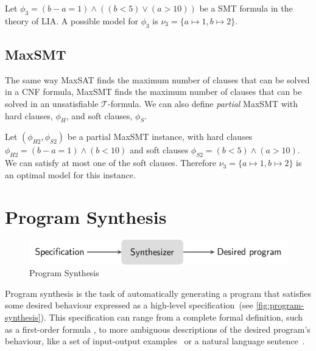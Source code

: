 \begin{example}
Let \(\phi_3 = (b - a = 1) \land ((b<5) \lor (a>10))\) be a \ac{SMT} formula in the theory of LIA. A possible model for \(\phi_3\) is \(\nu_3 = \{a \mapsto 1, b \mapsto 2\}\).
\end{example}


\subsection{\acl{MaxSMT}}

The same way \ac{MaxSAT} finds the maximum number of clauses that can be solved in a \ac{CNF} formula, \ac{MaxSMT} finds the maximum number of clauses that can be solved in an unsatisfiable \(\mathcal{T}\)-formula.
We can also define \textit{partial} \ac{MaxSMT} with hard clauses, \(\phi_H\), and soft clauses, \(\phi_S\).

\begin{example}
Let \((\phi_{H2}, \phi_{S2})\) be a partial \ac{MaxSMT} instance, with hard clauses \(\phi_{H2}=(b-a=1) \land (b<10)\) and soft clauses \(\phi_{S2} = (b<5) \land (a>10)\). We can satisfy at most one of the soft clauses. Therefore \(\nu_3 = \{a \mapsto 1, b \mapsto 2\}\) is an optimal model for this instance.
\end{example}

\section{Program Synthesis} \label{sec:back-ps}
\begin{figure}
    \centering
    \includegraphics[scale=.35]{pictures/program_synthesis.pdf}
    \caption{Program Synthesis}
    \label{fig:program-synthesis}
\end{figure}

Program synthesis is the task of automatically generating a program that satisfies some desired behaviour expressed as a high-level specification~(see \autoref{fig:program-synthesis}).
This specification can range from a complete formal definition, such as a first-order formula \cite{DBLP:conf/ijcai/Green69,DBLP:conf/pldi/GulwaniJTV11}, to more ambiguous descriptions of the desired program's behaviour, like a set of input-output examples~\cite{DBLP:conf/iclr/BalogGBNT17,DBLP:conf/pldi/FengMBD18,DBLP:conf/icse/JhaGST10,DBLP:conf/ijcai/ShawWG75,DBLP:journals/jacm/Summers77,DBLP:conf/aaai/ManshadiGA13,DBLP:conf/ijcai/RazaGM15,DBLP:conf/aaai/MortonHSPS20} or a natural language sentence~\cite{DBLP:conf/icse/DesaiGHJKMRR16,DBLP:journals/pacmpl/Yaghmazadeh0DD17,DBLP:conf/naacl/HuangWSYH18,Regel20,DBLP:conf/aaai/ManshadiGA13,DBLP:conf/ijcai/RazaGM15}.

